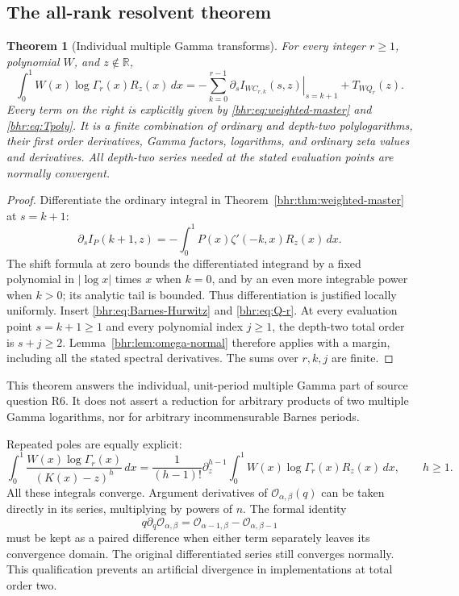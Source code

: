\documentclass[11pt]{article}
\numberwithin{equation}{section}
\theoremstyle{plain}
\newtheorem{theorem}{Theorem}[section]
\theoremstyle{definition}
\theoremstyle{remark}
\newcommand{\R}{\mathbb R}
\begin{document}
\subsection{The all-rank resolvent theorem}

\begin{theorem}[Individual multiple Gamma transforms]\label{bhr:thm:all-Barnes}
For every integer $r\ge1$, polynomial $W$, and $z\notin\R$,
\begin{equation}\label{bhr:eq:all-Barnes}
 \boxed{\displaystyle
 \int_0^1 W(x)\log\Gamma_r(x)R_z(x)\,dx
  =-\sum_{k=0}^{r-1}
      \left.\partial_s I_{W C_{r,k}}(s,z)\right|_{s=k+1}
          +T_{WQ_r}(z).}
\end{equation}
Every term on the right is explicitly given by
\eqref{bhr:eq:weighted-master} and \eqref{bhr:eq:Tpoly}. It is a finite
combination of ordinary and depth-two polylogarithms, their first
order derivatives, Gamma factors, logarithms, and ordinary zeta
values and derivatives. All depth-two series needed at the stated
evaluation points are normally convergent.
\end{theorem}

\begin{proof}
Differentiate the ordinary integral in
Theorem~\ref{bhr:thm:weighted-master} at $s=k+1$:
\[
 \partial_s I_P(k+1,z)
       =-\int_0^1P(x)\zeta'(-k,x)R_z(x)\,dx.
\]
The shift formula at zero bounds the differentiated integrand by
a fixed polynomial in $|\log x|$ times $x$ when $k=0$, and
by an even more integrable power when $k>0$; its analytic tail
is bounded. Thus differentiation is justified locally uniformly.
Insert \eqref{bhr:eq:Barnes-Hurwitz} and \eqref{bhr:eq:Q-r}.
At every evaluation point $s=k+1\ge1$ and every polynomial
index $j\ge1$, the depth-two total order is $s+j\ge2$.
Lemma~\ref{bhr:lem:omega-normal} therefore applies with a margin,
including all the stated spectral derivatives. The sums over
$r,k,j$ are finite.
\end{proof}

This theorem answers the individual, unit-period multiple Gamma
part of source question R6. It does not assert a reduction for
arbitrary products of two multiple Gamma logarithms, nor for
arbitrary incommensurable Barnes periods.

Repeated poles are equally explicit:
\begin{equation}\label{bhr:eq:Barnes-repeated}
 \int_0^1\frac{W(x)\log\Gamma_r(x)}{(K(x)-z)^h}\,dx
   =\frac1{(h-1)!}\partial_z^{h-1}
      \int_0^1W(x)\log\Gamma_r(x)R_z(x)\,dx,
 \qquad h\ge1.
\end{equation}
All these integrals converge. Argument derivatives of
$\mathcal O_{\alpha,\beta}(q)$ can be taken directly in its
series, multiplying by powers of $n$. The formal identity
\[
 q\partial_q\mathcal O_{\alpha,\beta}
  =\mathcal O_{\alpha-1,\beta}-\mathcal O_{\alpha,\beta-1}
\]
must be kept as a paired difference when either term separately
leaves its convergence domain. The original differentiated series
still converges normally. This qualification prevents an artificial
divergence in implementations at total order two.
\end{document}
